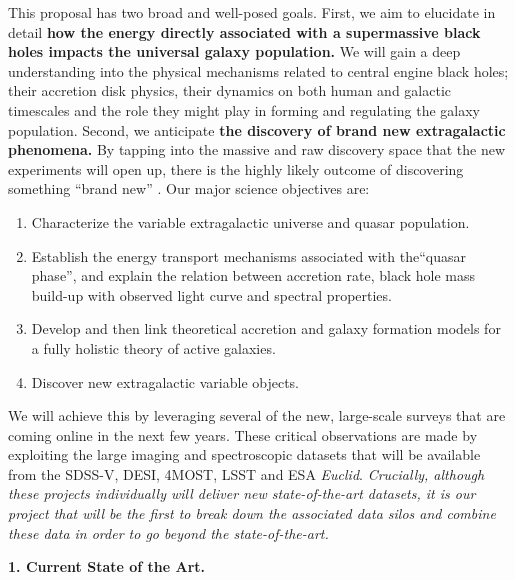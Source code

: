 \documentclass[oneside, a4paper, onecolumn, 11pt]{article}
\begin{document}
\smallskip
\smallskip
\noindent
This proposal has two broad and well-posed goals. First, we aim to
elucidate in detail {\bf how the energy directly associated with a
supermassive black holes impacts the universal galaxy population.} We
will gain a deep understanding into the physical mechanisms related to
central engine black holes; their accretion disk physics, their
dynamics on both human and galactic timescales and the role they might
play in forming and regulating the galaxy population.
Second, we anticipate {\bf the discovery of brand new extragalactic
phenomena.}  By tapping into the massive and raw discovery space that
the new experiments will open up, there is the highly likely outcome
of discovering something ``brand new'' \citep{Ivezic2008,
LSST_ScienceBook}.
Our major science objectives are:
\begin{enumerate}
\item Characterize the variable extragalactic universe and quasar population. 
\item Establish the energy transport mechanisms associated with the``quasar phase'', and explain the relation between accretion rate, black hole mass build-up with observed light curve and spectral properties. 
\item Develop and then link theoretical accretion and galaxy formation models for a fully holistic theory of active galaxies. 
\item Discover new extragalactic variable objects. 
\end{enumerate}


\smallskip
\smallskip
\noindent
We will achieve this by leveraging several of the new, large-scale surveys that are coming online in the next few years. These critical observations are made by exploiting the large imaging and spectroscopic datasets that will be available from the SDSS-V, DESI, 4MOST, LSST and ESA {\it Euclid}. {\it Crucially, although these  projects individually will deliver new state-of-the-art datasets, it is our project that will be the first to break down the associated data  silos and combine these data in order to go beyond the state-of-the-art.}

\medskip
\medskip
\noindent
\large
{\bf{\textcolor{Cerulean}{1. Current State of the Art.}}}
\normalsize
\end{document}
